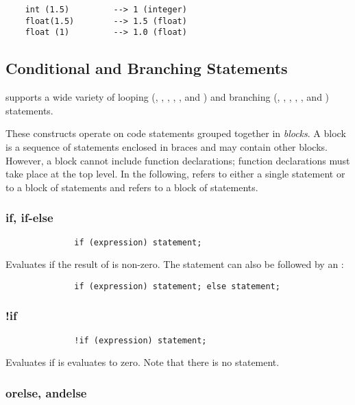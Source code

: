 \begin{verbatim}
    int (1.5)         --> 1 (integer)
    float(1.5)        --> 1.5 (float)
    float (1)         --> 1.0 (float)
\end{verbatim}

\subsection{Conditional and Branching Statements}

   \slang{} supports a wide variety of looping (, ,
   , , , and ) and branching
   (, , , , , and
   ) statements.

   These constructs operate on code statements grouped together in {\em
   blocks}.  A block is a sequence of \slang{} statements enclosed in braces
   and may contain other blocks.  However, a block cannot include function
   declarations; function declarations must take place at the top level.  In
   the following,  refers to either a single \slang{} statement
   or to a block of statements and  refers to a block of
   statements.

\subsubsection{if, if-else}
\begin{verbatim}   
              if (expression) statement;
\end{verbatim}
        Evaluates  if the result of  is
        non-zero.  The  statement can also be followed by an :
\begin{verbatim}
              if (expression) statement; else statement;
\end{verbatim}
    
\subsubsection{!if}
\begin{verbatim}   
              !if (expression) statement;
\end{verbatim}
        Evaluates  if  is evaluates to zero.  Note
        that there is no  statement.
        
\subsubsection{orelse, andelse}
   

